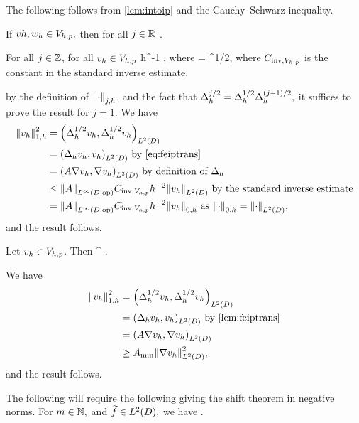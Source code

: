 The following  follows from \cref{lem:intoip} and the Cauchy--Schwarz inequality.

\label{cor:ipdiscbound}
If $vh, w_{h} \in V_{h,p},$ then for all $j \in \mathbb R$
\beqs
\IPLtD{\vh}{\wh} \leq \Njh{\vh}\Nmjh{\wh}.
\eeqs
\eco

\label{lem:inversediscrete}
For all $j \in \mathbb Z$, for all $v_{h} \in V_{h,p}$
\beqs
\Njh{\vh} \leq \Chinv h^{-1} \Njmoh{\vh},
\eeqs
where
\beqs
\Chinv = \CinvVhp {}^{1/2},
\eeqs
where $C_{\mathrm{inv},V_{h,p}}$ is the constant in the standard inverse estimate.
\ele

by the definition of $\Njh{\cdot}$, and the fact that $\Delta_{h}^{j/2} = \Delta_{h}^{1/2}\Delta_{h}^{(j-1)/2},$ it suffices to prove the result for $j=1$. We have
\begin{align*}
\Noh{\vh}^2 &= \IPLtD{\Deltahh \vh}{\Deltahh \vh}\\
&= \IPLtD{\Deltah \vh}{\vh} \text{ by \cref{eq:feiptrans}}\\
&= \IPLtD{A \grad \vh}{\grad \vh} \text{ by definition of } \Deltah\\
&\leq \NLiDop{A} \CinvVhp h^{-2} \NLtD{\vh} \text{ by the standard inverse estimate}\\
&= \NLiDop{A} \CinvVhp h^{-2} \Nzh{\vh} \text{ as } \Nzh{\cdot} = \NLtD{\cdot},
\end{align*}
and the result follows.
\epf

\label{lem:h1contdisc}
Let $v_{h} \in V_{h,p}$. Then
\beqs
\SNHoD{\vh} \leq \Amin^{\half} \Noh{\vh}.
\eeqs
\ele

We have
\begin{align*}
\Noh{\vh}^2 &= \IPLtD{\Deltahh \vh}{\Deltahh \vh}\\
&= \IPLtD{\Deltah \vh}{\vh} \text{ by \cref{lem:feiptrans}}\\
&= \IPLtD{A \grad \vh}{\grad \vh}\\
&\geq \Amin \NLtD{\grad \vh}^2,
\end{align*}
and the result follows.
\epf

The following  will require the following  giving the shift theorem in negative norms.
\label{lem:shiftnegative}
For $m \in \mathbb N,$ and $\ftilde \in \LtD,$ we have
\beqs
\NHmmD{\DeltaAI\mleft(\ftilde\mright)} \leq \CAm \NHmmmtD{\ftilde}.
\eeqs
\ele

